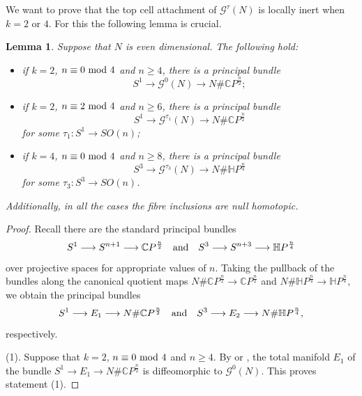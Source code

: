 \documentclass[a4]{amsart}
\newtheorem{lemma}[theorem]{Lemma}
\theoremstyle{definition}
\begin{document}
\begin{sloppypar}
We want to prove that the top cell attachment of $\mathcal{G}^{\tau}(N)$ is locally inert when $k=2$ or $4$. 
For this the following lemma is crucial. 
\begin{lemma}\label{bundlegyrationlemma}
Suppose that $N$ is even dimensional. The following hold:
\begin{itemize}
\item[(1).]
if $k=2$, $n\equiv 0~{\rm mod}~4$ and $n\geq 4$, there is a principal bundle
\[
S^1\stackrel{}{\longrightarrow} \mathcal{G}^{0}(N) \stackrel{}{\longrightarrow} N\# \mathbb{C}P^{\frac{n}{2}};
\]
\item[(2).]
if $k=2$, $n\equiv 2~{\rm mod}~4$ and $n\geq 6$, there is a principal bundle
\[
S^1\stackrel{}{\longrightarrow} \mathcal{G}^{\tau_1}(N) \stackrel{}{\longrightarrow} N\# \mathbb{C}P^{\frac{n}{2}}
\]
for some $\tau_1: S^1\stackrel{}{\longrightarrow} SO(n)$;
\item[(3).] 
if $k=4$, $n\equiv 0~{\rm mod}~4$ and $n\geq 8$, there is a principal bundle
\[
S^3\stackrel{}{\longrightarrow} \mathcal{G}^{\tau_3}(N) \stackrel{}{\longrightarrow} N\# \mathbb{H}P^{\frac{n}{4}}
\]
for some $\tau_3: S^3\stackrel{}{\longrightarrow} SO(n)$.
\end{itemize}
Additionally, in all the cases the fibre inclusions are null homotopic. 
\end{lemma}
\begin{proof}
Recall there are the standard principal bundles 
\[
S^1\stackrel{}{\longrightarrow} S^{n+1}\stackrel{}{\longrightarrow} \mathbb{C}P^{\frac{n}{2}}\ \ \  {\rm and} \ \ \ 
S^3\stackrel{}{\longrightarrow} S^{n+3}\stackrel{}{\longrightarrow} \mathbb{H}P^{\frac{n}{4}}
\]
over projective spaces for appropriate values of $n$. Taking the pullback of the bundles along the canonical quotient maps $N\# \mathbb{C}P^{\frac{n}{2}} \stackrel{}{\longrightarrow} \mathbb{C}P^{\frac{n}{2}}$ and $N\# \mathbb{H}P^{\frac{n}{4}} \stackrel{}{\longrightarrow} \mathbb{H}P^{\frac{n}{4}}$, we obtain the principal bundles
\[
S^1\stackrel{}{\longrightarrow} E_1\stackrel{}{\longrightarrow} N\# \mathbb{C}P^{\frac{n}{2}}\ \ \  {\rm and} \ \ \ 
S^3\stackrel{}{\longrightarrow} E_2\stackrel{}{\longrightarrow}N\# \mathbb{H}P^{\frac{n}{4}},
\]
respectively. 

(1). Suppose that $k=2$, $n\equiv 0~{\rm mod}~4$ and $n\geq 4$. 
By \cite[Lemma 3.4]{HT23} or \cite[Theorem B]{Dua22}, the total manifold $E_1$ of the bundle $S^1\stackrel{}{\longrightarrow} E_1\stackrel{}{\longrightarrow} N\# \mathbb{C}P^{\frac{n}{2}}$ is diffeomorphic to $\mathcal{G}^{0}(N)$. This proves statement (1).


\end{proof}
\end{sloppypar}
\end{document}
